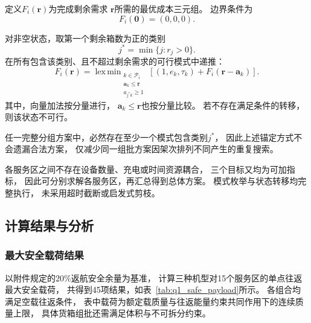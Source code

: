 \documentclass[bwprint]{gmcmthesis}
\begin{document}
定义$F_i(\boldsymbol{r})$为完成剩余需求
$\boldsymbol{r}$所需的最优成本三元组。
边界条件为
\begin{equation}
    F_i(\boldsymbol{0})=(0,0,0).
\end{equation}

对非空状态，取第一个剩余箱数为正的类别
\begin{equation}
    j^{*}
    =
    \min\{j:r_j>0\}.
\end{equation}
在所有包含该类别、且不超过剩余需求的可行模式中递推：
\begin{equation}
    F_i(\boldsymbol{r})
    =
    \operatorname{lex\,min}_{\substack{
        k\in\mathcal{P}_i\\
        \boldsymbol{a}_k\leq\boldsymbol{r}\\
        a_{j^{*}k}\geq1
    }}
    \left[
        (1,e_k,\tau_k)
        +
        F_i(\boldsymbol{r}-\boldsymbol{a}_k)
    \right].
\label{eq:q1_dp}
\end{equation}
其中，向量加法按分量进行，
$\boldsymbol{a}_k\leq\boldsymbol{r}$也按分量比较。
若不存在满足条件的转移，则该状态不可行。

任一完整分组方案中，必然存在至少一个模式包含类别$j^{*}$，
因此上述锚定方式不会遗漏合法方案，
仅减少同一组批方案因架次排列不同产生的重复搜索。

各服务区之间不存在设备数量、充电或时间资源耦合，
三个目标又均为可加指标，
因此可分别求解各服务区，再汇总得到总体方案。
模式枚举与状态转移均完整执行，
未采用超时截断或启发式剪枝。

\subsection{计算结果与分析}

\subsubsection{最大安全载荷结果}

以附件规定的$20\%$返航安全余量为基准，
计算三种机型对15个服务区的单点往返最大安全载荷，
共得到45项结果，如表~\ref{tab:q1_safe_payload}所示。
各组合均满足空载往返条件，
表中载荷为额定载质量与往返能量约束共同作用下的连续质量上限，
具体货箱组批还需满足体积与不可拆分约束。
\end{document}
